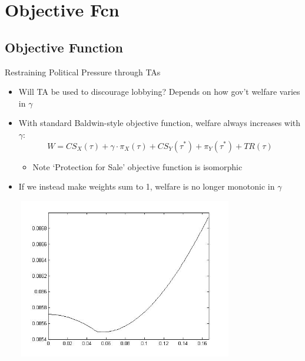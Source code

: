 \documentclass[handout]{beamer}
\newcommand{\ga}{\gamma}
\begin{document}


\section{Objective Fcn}
\subsection{Objective Function}
\begin{frame}{Restraining Political Pressure through TAs}
\pause
\begin{itemize}[<+->]
	\item Will TA be used to discourage lobbying? Depends on how gov't welfare varies in $\ga$
	\item With standard Baldwin-style objective function, welfare always increases with $\ga$:
\[
  W = \mathit{CS}_X(\tau) + \ga \cdot \pi_X(\tau) + \mathit{CS}_Y(\tau^*) + \pi_Y(\tau^*) + \mathit{TR}(\tau)
\]
	\begin{itemize}
		\item Note `Protection for Sale' objective function is isomorphic
	\end{itemize}

	\item If we instead make weights sum to 1, welfare is no longer monotonic in $\ga$
\end{itemize}
\end{frame}

\begin{frame}
\includegraphics[height=2.75in, width=4.25in]{weight.jpg}
\end{frame}
\end{document}
